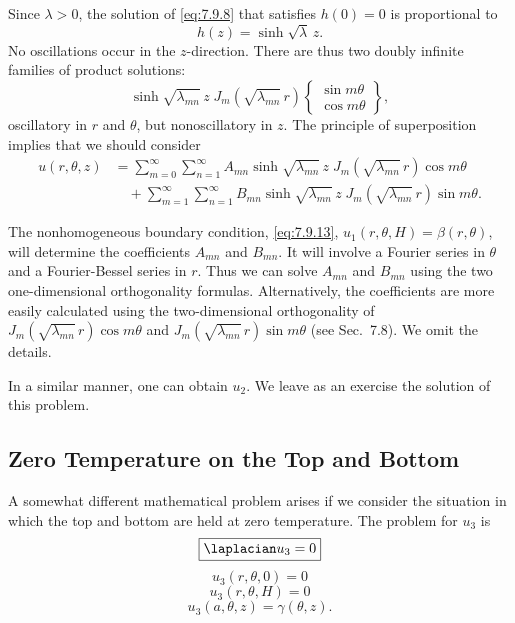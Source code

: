 Since $\lambda > 0$, the solution of \eqref{eq:7.9.8} that satisfies $h(0) = 0$ is proportional to
\begin{equation}
h(z) = \sinh\sqrt{\lambda}\,z.
\label{eq:7.9.19}
\end{equation}
No oscillations occur in the $z$-direction.  There are thus two doubly infinite families of product solutions:
\begin{equation}
\sinh\sqrt{\lambda_{mn}}\,z\;J_m\left(\sqrt{\lambda_{mn}}\,r\right)
\begin{Bmatrix} \sin m\theta \\ \cos m\theta \end{Bmatrix},
\label{eq:7.9.20}
\end{equation}
oscillatory in $r$ and $\theta$, but nonoscillatory in $z$.  The principle of superposition implies that we should consider
\begin{equation}
\boxed{\begin{aligned}
u(r,\theta,z) &= \sum_{m=0}^{\infty}\sum_{n=1}^{\infty} A_{mn}\sinh\sqrt{\lambda_{mn}}\,z\;J_m\left(\sqrt{\lambda_{mn}}\,r\right)\cos m\theta \\
&\quad + \sum_{m=1}^{\infty}\sum_{n=1}^{\infty} B_{mn}\sinh\sqrt{\lambda_{mn}}\,z\;J_m\left(\sqrt{\lambda_{mn}}\,r\right)\sin m\theta.
\end{aligned}}
\label{eq:7.9.21}
\end{equation}

The nonhomogeneous boundary condition, \eqref{eq:7.9.13}, $u_1(r,\theta,H) = \beta(r,\theta)$, will determine the coefficients $A_{mn}$ and $B_{mn}$.  It will involve a Fourier series in $\theta$ and a Fourier-Bessel series in $r$.  Thus we can solve $A_{mn}$ and $B_{mn}$ using the two one-dimensional orthogonality formulas.  Alternatively, the coefficients are more easily calculated using the two-dimensional orthogonality of $J_m\left(\sqrt{\lambda_{mn}}\,r\right)\cos m\theta$ and $J_m\left(\sqrt{\lambda_{mn}}\,r\right)\sin m\theta$ (see Sec.~7.8).  We omit the details.

In a similar manner, one can obtain $u_2$.  We leave as an exercise the solution of this problem.

\subsection{Zero Temperature on the Top and Bottom}
\label{sec:7.9.4}

A somewhat different mathematical problem arises if we consider the situation in which the top and bottom are held at zero temperature.  The problem for $u_3$ is
\begin{equation}
\boxed{\laplacian u_3 = 0}
\label{eq:7.9.22}
\end{equation}
\begin{equation}
\boxed{u_3(r,\theta,0) = 0}
\label{eq:7.9.23}
\end{equation}
\begin{equation}
\boxed{u_3(r,\theta,H) = 0}
\label{eq:7.9.24}
\end{equation}
\begin{equation}
\boxed{u_3(a,\theta,z) = \gamma(\theta,z).}
\label{eq:7.9.25}
\end{equation}

